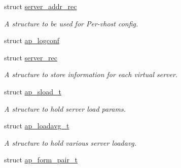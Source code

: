 \begin{DoxyCompactItemize}
struct \hyperlink{structserver__addr__rec}{server\+\_\+addr\+\_\+rec}
\begin{DoxyCompactList}\small\item\em A structure to be used for Per-\/vhost config. \end{DoxyCompactList}\item 
struct \hyperlink{structap__logconf}{ap\+\_\+logconf}
\item 
struct \hyperlink{structserver__rec}{server\+\_\+rec}
\begin{DoxyCompactList}\small\item\em A structure to store information for each virtual server. \end{DoxyCompactList}\item 
struct \hyperlink{structap__sload__t}{ap\+\_\+sload\+\_\+t}
\begin{DoxyCompactList}\small\item\em A structure to hold server load params. \end{DoxyCompactList}\item 
struct \hyperlink{structap__loadavg__t}{ap\+\_\+loadavg\+\_\+t}
\begin{DoxyCompactList}\small\item\em A structure to hold various server loadavg. \end{DoxyCompactList}\item 
struct \hyperlink{structap__form__pair__t}{ap\+\_\+form\+\_\+pair\+\_\+t}
\end{DoxyCompactItemize}
